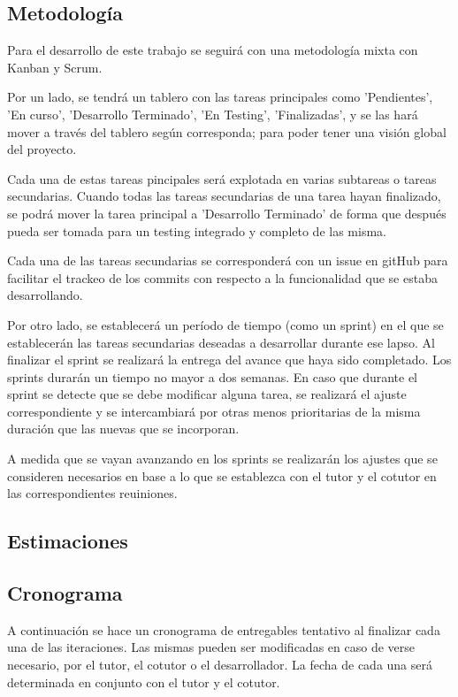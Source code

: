 \documentclass[a4paper]{article}
\begin{document}
\subsection{Metodología}

Para el desarrollo de este trabajo se seguirá con una metodología mixta con Kanban y Scrum.

Por un lado, se tendrá un tablero con las tareas principales como 'Pendientes', 'En curso', 'Desarrollo Terminado', 'En Testing', 'Finalizadas', y se las hará mover a través del tablero según corresponda; para poder tener una visión global del proyecto.

Cada una de estas tareas pincipales será explotada en varias subtareas o tareas secundarias. Cuando todas las tareas secundarias de una tarea hayan finalizado, se podrá mover la tarea principal a 'Desarrollo Terminado' de forma que después pueda ser tomada para un testing integrado y completo de las misma.

Cada una de las tareas secundarias se corresponderá con un issue en gitHub para facilitar el trackeo de los commits con respecto a la funcionalidad que se estaba desarrollando.

Por otro lado, se establecerá un período de tiempo (como un sprint) en el que se establecerán las tareas secundarias deseadas a desarrollar durante ese lapso. Al finalizar el sprint se realizará la entrega del avance que haya sido completado. Los sprints durarán un tiempo no mayor a dos semanas. En caso que durante el sprint se detecte que se debe modificar alguna tarea, se realizará el ajuste correspondiente y se intercambiará por otras menos prioritarias de la misma duración que las nuevas que se incorporan.

A medida que se vayan avanzando en los sprints se realizarán los ajustes que se consideren necesarios en base a lo que se establezca con el tutor y el cotutor en las correspondientes reuiniones.

\subsection{Estimaciones}

\subsection{Cronograma}

A continuación se hace un cronograma de entregables tentativo al finalizar cada una de las iteraciones. Las mismas pueden ser modificadas en caso de verse necesario, por el tutor, el cotutor o el desarrollador. La fecha de cada una será determinada en conjunto con el tutor y el cotutor.
\end{document}
